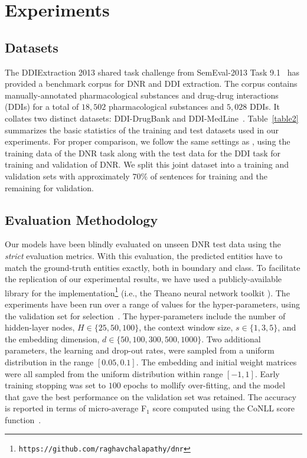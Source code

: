 \documentclass[11pt,letterpaper]{article}
\begin{document}
\section{Experiments}

\subsection{Datasets}
The DDIExtraction 2013 shared task challenge from SemEval-2013 Task 9.1~\cite{segura2013semeval} has provided a benchmark corpus for DNR and DDI extraction. The corpus contains manually-annotated pharmacological substances and drug-drug interactions (DDIs) for a total of $18,502$ pharmacological substances and $5,028$ DDIs. It collates two distinct datasets: DDI-DrugBank and DDI-MedLine~\cite{herrero2013ddi}. Table~\ref{table2} summarizes the basic statistics of the training and test datasets used in our experiments. For proper comparison, we follow the same settings as \cite{segura2015exploring}, using the training data of the DNR task along with the test data for the DDI task for training and validation of DNR. We split this joint dataset into a training and validation sets with approximately $70\%$ of sentences for training and the remaining for validation.

\subsection{Evaluation Methodology}
Our models have been blindly evaluated on unseen DNR test data using the \textit{strict} evaluation metrics. With this evaluation, the predicted entities have to match the ground-truth entities exactly, both in boundary and class. To facilitate the replication of our experimental results, we have used a publicly-available library for the implementation\footnote{\tt https://github.com/raghavchalapathy/dnr} (i.e., the Theano neural network toolkit \cite{bergstra2010theano}). The experiments have been run over a range of values for the hyper-parameters, using the validation set for selection~\cite{bergstra2012random}. The hyper-parameters include the number of hidden-layer nodes, $H \in \{25, 50, 100\}$, the context window size, $s \in \{1, 3, 5\}$, and the embedding dimension, $d \in \{50, 100, 300, 500, 1000\}$. Two additional parameters, the learning and drop-out rates, were sampled from a uniform distribution in the range $[0.05, 0.1]$. The embedding and initial weight matrices were all sampled from the uniform distribution within range $[-1, 1]$. Early training stopping was set to $100$ epochs to mollify over-fitting, and the model that gave the best performance on the validation set was retained. The accuracy is reported in terms of micro-average F$_1$ score computed using the CoNLL score function~\cite{Nadeau:07}.
\end{document}
